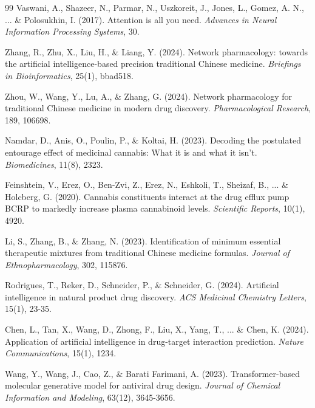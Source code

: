 \documentclass[12pt, a4paper]{article}
\begin{document}
\begin{thebibliography}{99}
Vaswani, A., Shazeer, N., Parmar, N., Uszkoreit, J., Jones, L., Gomez, A. N., ... \& Polosukhin, I. (2017).
\newblock Attention is all you need.
\newblock \textit{Advances in Neural Information Processing Systems}, 30.

Zhang, R., Zhu, X., Liu, H., \& Liang, Y. (2024).
\newblock Network pharmacology: towards the artificial intelligence-based precision traditional Chinese medicine.
\newblock \textit{Briefings in Bioinformatics}, 25(1), bbad518.

Zhou, W., Wang, Y., Lu, A., \& Zhang, G. (2024).
\newblock Network pharmacology for traditional Chinese medicine in modern drug discovery.
\newblock \textit{Pharmacological Research}, 189, 106698.

Namdar, D., Anis, O., Poulin, P., \& Koltai, H. (2023).
\newblock Decoding the postulated entourage effect of medicinal cannabis: What it is and what it isn't.
\newblock \textit{Biomedicines}, 11(8), 2323.

Feinshtein, V., Erez, O., Ben-Zvi, Z., Erez, N., Eshkoli, T., Sheizaf, B., ... \& Holcberg, G. (2020).
\newblock Cannabis constituents interact at the drug efflux pump BCRP to markedly increase plasma cannabinoid levels.
\newblock \textit{Scientific Reports}, 10(1), 4920.

Li, S., Zhang, B., \& Zhang, N. (2023).
\newblock Identification of minimum essential therapeutic mixtures from traditional Chinese medicine formulas.
\newblock \textit{Journal of Ethnopharmacology}, 302, 115876.

Rodrigues, T., Reker, D., Schneider, P., \& Schneider, G. (2024).
\newblock Artificial intelligence in natural product drug discovery.
\newblock \textit{ACS Medicinal Chemistry Letters}, 15(1), 23-35.

Chen, L., Tan, X., Wang, D., Zhong, F., Liu, X., Yang, T., ... \& Chen, K. (2024).
\newblock Application of artificial intelligence in drug-target interaction prediction.
\newblock \textit{Nature Communications}, 15(1), 1234.

Wang, Y., Wang, J., Cao, Z., \& Barati Farimani, A. (2023).
\newblock Transformer-based molecular generative model for antiviral drug design.
\newblock \textit{Journal of Chemical Information and Modeling}, 63(12), 3645-3656.


\end{thebibliography}
\end{document}
